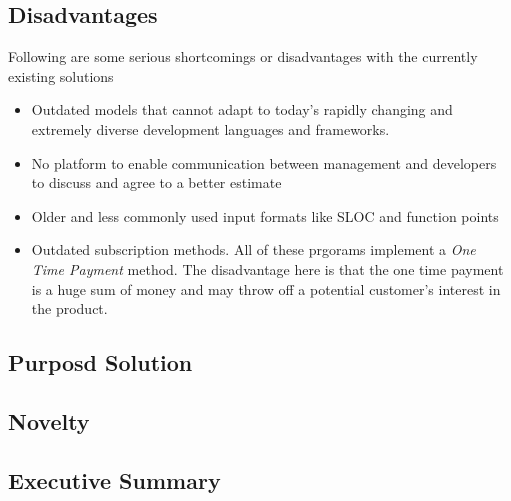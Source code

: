 \subsection{Disadvantages}
Following are some serious shortcomings or disadvantages with the currently existing solutions
\begin{itemize}
	\item Outdated models that cannot adapt to today's rapidly changing and extremely diverse development languages and frameworks.
	\item No platform to enable communication between management and developers to discuss and agree to a better estimate
	\item Older and less commonly used input formats like SLOC and function points
	\item Outdated subscription methods. All of these prgorams implement a {\it{One Time Payment}} method. The disadvantage here is that the one time payment is a huge sum of money and may throw off a potential customer's interest in the product.
\end{itemize}









\subsection{Purposd Solution}
\blindtext[2]







\subsection{Novelty}
\blindtext[1]








\subsection{Executive Summary}
\blindtext[2]

